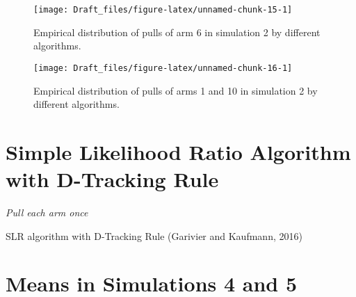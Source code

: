 \documentclass[11pt,]{article}
\begin{document}
\begin{figure}

{\centering \texttt{[image: Draft\_files/figure-latex/unnamed-chunk-15-1]} 

}

\caption{Empirical distribution of pulls of arm 6 in simulation 2 by different algorithms.}\label{fig:unnamed-chunk-15}
\end{figure}

\begin{figure}

{\centering \texttt{[image: Draft\_files/figure-latex/unnamed-chunk-16-1]} 

}

\caption{Empirical distribution of pulls of arms 1 and 10 in simulation 2 by different algorithms.}\label{fig:unnamed-chunk-16}
\end{figure}

\newpage

\section{Simple Likelihood Ratio Algorithm with D-Tracking Rule} \label{app:SLRD}

\IncMargin{1em}

\begin{algorithm}
\BlankLine
\emph{Pull each arm once}\;
\caption{SLR algorithm with D-Tracking Rule (Garivier and Kaufmann, 2016)} \label{algo_slr_1d_dTracking}
\end{algorithm}

\DecMargin{1em}

\newpage

\section{Means in Simulations 4 and 5} \label{app:MeansSim45}
\end{document}
